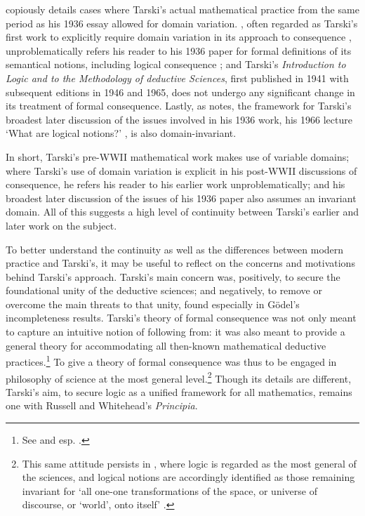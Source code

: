 \documentclass[]{article}
\begin{document}
\cite[pp. 251-267]{Gomez-Torrente2009} copiously details cases where Tarski's actual mathematical practice from the same period as his 1936 essay allowed for domain variation. \cite{Tarski1953a}, often regarded as Tarski's first work to explicitly require domain variation in its approach to consequence \cite[p. 367]{Corcoran2011} \cite[p. 65]{Etchemendy1988}, unproblematically refers his reader to his 1936 paper for formal definitions of its semantical notions, including logical consequence \cite[p. 8, n. 7]{Tarski1953a} \cite[p. 259]{Gomez-Torrente2009}; and Tarski's  \textit{Introduction to Logic and to the Methodology of deductive Sciences}, first published in 1941 with subsequent editions in 1946 and 1965, does not undergo any significant change in its treatment of formal consequence. Lastly, as \cite[pp. 365-366]{Corcoran2011} notes, the framework for Tarski's broadest later discussion of the issues involved in his 1936 work, his 1966 lecture `What are logical notions?' \cite{Tarski1986}, is also domain-invariant.

In short, Tarski's pre-WWII mathematical work makes use of variable domains; where Tarski's use of domain variation is explicit in his post-WWII discussions of consequence, he refers his reader to his earlier work unproblematically; and his broadest later discussion of the issues of his 1936 paper also assumes an invariant domain. All of this suggests a high level of continuity between Tarski's earlier and later work on the subject.

To better understand the continuity as well as the differences between modern practice and Tarski's, it may be useful to reflect on the concerns and motivations behind Tarski's approach. Tarski's main concern was, positively, to secure the foundational unity of the deductive sciences; and negatively, to remove or overcome the main threats to that unity, found especially in G\"{o}del's incompleteness results. Tarski's theory of formal consequence was not only meant to capture an intuitive notion of following from: it was also meant to provide a general theory for accommodating all then-known mathematical deductive practices.\footnote{See \cite{Blok1988} and esp. \cite{Jane2006}.} To give a theory of formal consequence was thus to be engaged in philosophy of science at the most general level.\footnote{This same attitude persists in \cite{Tarski1986}, where logic is regarded as the most general of the sciences, and logical notions are accordingly identified as those remaining invariant for `all one-one transformations of the space, or universe of discourse, or `world', onto itself' \cite[p. 49]{Tarski1986}.} Though its details are different, Tarski's aim, to secure logic as a unified framework for all mathematics, remains one with Russell and Whitehead's \textit{Principia}.
\end{document}
